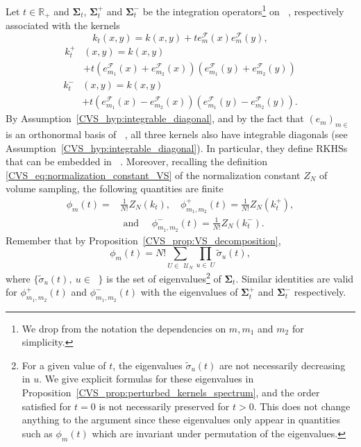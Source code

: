 \documentclass[twoside,11pt]{book}
\numberwithin{theorem}{chapter}
\numberwithin{definition}{chapter}
\numberwithin{proposition}{chapter}
\numberwithin{corollary}{chapter}
\numberwithin{example}{chapter}
\numberwithin{lemma}{chapter}
\DeclareMathOperator{\F}{\mathcal{F}}
\DeclareMathOperator{\X}{\mathcal{X}}
\DeclareMathOperator{\Ltwo}{\mathbb{L}_{2}(\mathrm{d} \omega)}
\DeclareMathOperator{\Ns}{\mathbb{N}^{*}}
\def\UN{\:\mathcal{U}_N}
\begin{document}
Let $t\in\mathbb{R}_{+}$ and $\bm{\Sigma}_{t}$, $\bm{\Sigma}_{t}^{+}$ and $\bm{\Sigma}_{t}^{-}$ be the integration operators\footnote{We drop from the notation the dependencies on $m,m_{1}$ and $m_{2}$ for simplicity.} on $\Ltwo$, respectively associated with the kernels
\begin{equation}\label{CVS_eq:k_t}
k_{t}(x,y) = k(x,y) + t e_{m}^{\F}(x) e_{m}^{\F}(y),
\end{equation}
\begin{align}\label{CVS_eq:k_t_plus}
k_{t}^{+}&(x,y) = k(x,y)  \\
& + t \left( e_{m_{1}}^{\F}(x) + e_{m_{2}}^{\F}(x) \right) \left( e_{m_{1}}^{\F}(y) + e_{m_{2}}^{\F}(y) \right)\nonumber
\end{align}
\begin{align}\label{CVS_eq:k_t_minus}
k_{t}^{-}&(x,y) = k(x,y)\\
& + t \left( e_{m_{1}}^{\F}(x) - e_{m_{2}}^{\F}(x) \right) \left( e_{m_{1}}^{\F}(y) - e_{m_{2}}^{\F}(y) \right) \nonumber.
\end{align}
By Assumption~\ref{CVS_hyp:integrable_diagonal}, and by the fact that $(e_{m})_{m \in \Ns}$ is an orthonormal basis of $\Ltwo$, all three kernels also have integrable diagonals (see Assumption~\ref{CVS_hyp:integrable_diagonal}).
In particular, they define RKHSs that can be embedded in $\Ltwo$. Moreover, recalling the definition \eqref{CVS_eq:normalization_constant_VS} of the normalization constant $Z_{N}$ of volume sampling, the following quantities are finite
\begin{align}
\phi_{m}(t) = & \frac{1}{N!} Z_{N}(k_{t}) , \quad\phi_{m_{1},m_{2}}^{+}(t) = \frac{1}{N!} Z_{N}(k_{t}^{+}),\nonumber\\  &\text{ and }\quad \phi_{m_{1},m_{2}}^{-}(t) = \frac{1}{N!} Z_{N}(k_{t}^{-}).
\end{align}
Remember that by Proposition~\ref{CVS_prop:VS_decomposition},
\begin{equation}\label{CVS_eq:Z_kt}
\phi_{m}(t) = N! \sum\limits_{U \in \: \UN} \prod\limits_{u \in \: U} \tilde{\sigma}_{u}(t),
\end{equation}
where $\displaystyle \{\tilde{\sigma}_{u}(t), \: u \in \Ns\}$ is the set of eigenvalues\footnote{For a given value of $t$, the eigenvalues $\tilde{\sigma}_{u}(t)$ are not necessarily decreasing in $u$. We give explicit formulas for these eigenvalues in Proposition~\ref{CVS_prop:perturbed_kernels_spectrum}, and the order satisfied for $t=0$ is not necessarily preserved for $t>0$. This does not change anything to the argument since these eigenvalues only appear in quantities such as $\phi_{m}(t)$ which are invariant under permutation of the eigenvalues.} of $\bm{\Sigma}_{t}$. Similar identities are valid for $\phi_{m_{1},m_{2}}^{+}(t)$ and $\phi_{m_{1},m_{2}}^{-}(t)$ with the eigenvalues of $\bm{\Sigma}_{t}^{+}$ and $\bm{\Sigma}_{t}^{-}$ respectively.
\end{document}
